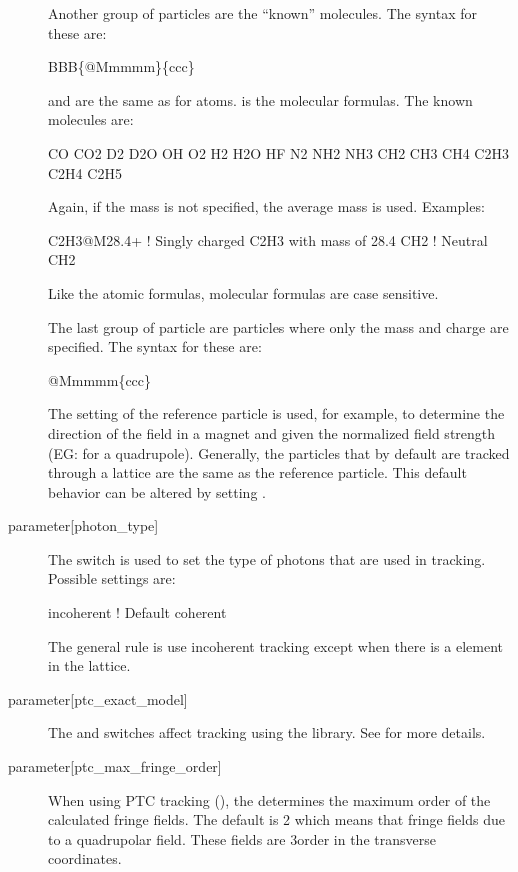 \begin{description}
Another group of particles are the ``known'' molecules. The syntax for these are:
\begin{example}
  BBB\{@Mmmmm\}\{ccc\}
\end{example}
 and  are the same as for atoms.
 is the molecular formulas. The known molecules are:
\begin{example}
CO       CO2      
D2       D2O      
OH       O2      
H2       H2O      HF
N2       NH2      NH3      
CH2      CH3      CH4      
C2H3     C2H4     C2H5
\end{example}
Again, if the mass is not specified, the average mass is used. Examples:
\begin{example}
  C2H3@M28.4+     ! Singly charged C2H3 with mass of 28.4
  CH2             ! Neutral CH2
\end{example}
Like the atomic formulas, molecular formulas are case sensitive.

The last group of particle are particles where only the mass and charge are specified.
The syntax for these are:
\begin{example}
  @Mmmmm\{ccc\}
\end{example}

The setting of the reference particle is
used, for example, to determine the direction of the field in a magnet
and given the normalized field strength (EG:  for a
quadrupole).  Generally, the particles that by default are tracked
through a lattice are the same as the reference particle. This default
behavior can be altered by setting
.

  \item[{parameter[photon_type]}] \Newline
The  switch is used to set the type of photons that
are used in tracking. Possible settings are:
\begin{example}
  incoherent    ! Default
  coherent 
\end{example}
The general rule is use incoherent tracking except when there is a
 element in the lattice. 

  \item[{parameter[ptc_exact_model]}] \Newline
The  and  switches affect
tracking using the  library. See  for more
details.

  \item[{parameter[ptc_max_fringe_order]}] \Newline
When using PTC tracking (), the
 determines the maximum order of
the calculated fringe fields. The default is 2 which means that fringe
fields due to a quadrupolar field. These fields are 3\Rd order in the
transverse coordinates.


\end{description}
